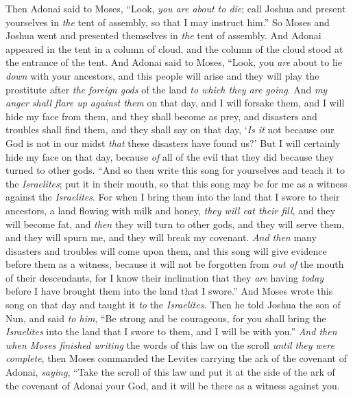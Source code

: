 \begin{biblechapter}
\verse Then Adonai said to Moses, “Look, \textit{you are about to die}; call Joshua and present yourselves in \textit{the} tent of assembly, so that I may instruct him.” So Moses and Joshua went and presented themselves in \textit{the} tent of assembly.
\verse And Adonai appeared in the tent in a column of cloud, and the column of the cloud stood at the entrance of the tent.
\verse And Adonai said to Moses, “Look, you \textit{are} about to lie \textit{down} with your ancestors, and this people will arise and they will play the prostitute after \textit{the foreign gods} of the land \textit{to which they are going}.
\verse And \textit{my anger shall flare up against them} on that day, and I will forsake them, and I will hide my face from them, and they shall become as prey, and disasters and troubles shall find them, and they shall say on that day, ‘\textit{Is it} not because our God is not in our midst \textit{that} these disasters have found us?’
\verse But I will certainly hide my face on that day, because \textit{of} all of the evil that they did because they turned to other gods.
\verse “And so then write this song for yourselves and teach it to the \textit{Israelites}; put it in their mouth, so that this song may be for me as a witness against the \textit{Israelites}.
\verse For when I bring them into the land that I swore to their ancestors, a land flowing with milk and honey, \textit{they will eat their fill}, and they will become fat, and \textit{then} they will turn to other gods, and they will serve them, and they will spurn me, and they will break my covenant.
\verse \textit{And then} many disasters and troubles will come upon them, and this song will give evidence before them as a witness, because it will not be forgotten from \textit{out of} the mouth of their descendants, for I know their inclination that they \textit{are} having \textit{today} before I have brought them into the land that I swore.”
\verse And Moses wrote this song on that day and taught it \textit{to} the \textit{Israelites}.
\verse Then he told Joshua the son of Nun, and said \textit{to him}, “Be strong and be courageous, for you shall bring the \textit{Israelites} into the land that I swore to them, and I will be with you.”
\verse \textit{And then when Moses finished writing} the words of this law on the scroll \textit{until they were complete},
\verse then Moses commanded the Levites carrying the ark of the covenant of Adonai, \textit{saying},
\verse “Take the scroll of this law and put it at the side of the ark of the covenant of Adonai your God, and it will be there as a witness against you.

\end{biblechapter}

